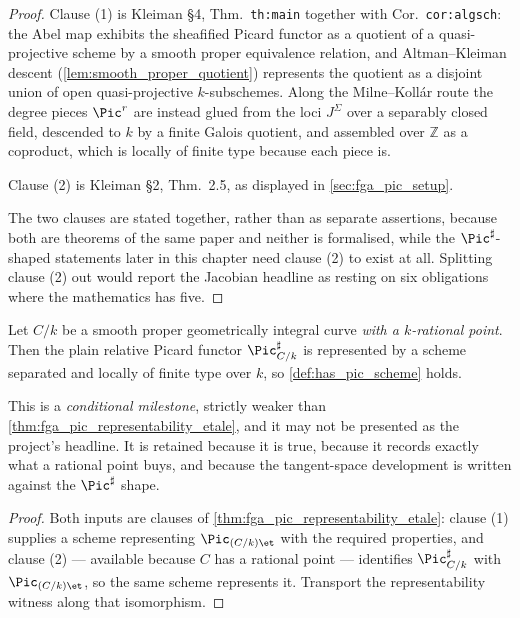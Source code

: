\begin{proof}
  Clause (1) is Kleiman \S 4, Thm.~\texttt{th:main} together with Cor.\
  \texttt{cor:algsch}: the Abel map exhibits the sheafified Picard functor as a
  quotient of a quasi-projective scheme by a smooth proper equivalence
  relation, and Altman--Kleiman descent (\cref{lem:smooth_proper_quotient})
  represents the quotient as a disjoint union of open quasi-projective
  \(k\)-subschemes. Along the Milne--Koll\'ar route the degree pieces
  \(\Pic^r\) are instead glued from the loci \(J^\Sigma\) over a separably
  closed field, descended to \(k\) by a finite Galois quotient, and assembled
  over \(\mathbb{Z}\) as a coproduct, which is locally of finite type because
  each piece is.

  Clause (2) is Kleiman \S 2, Thm.~2.5, as displayed in
  \cref{sec:fga_pic_setup}.

  The two clauses are stated together, rather than as separate assertions,
  because both are theorems of the same paper and neither is formalised, while
  the \(\Pic^\sharp\)-shaped statements later in this chapter need clause (2)
  to exist at all. Splitting clause (2) out would report the Jacobian headline
  as resting on six obligations where the mathematics has five.
\end{proof}

\begin{definition}[Picard scheme of a pointed curve]\leanok
  \label{def:inst_has_pic_scheme}
  Let \(C/k\) be a smooth proper geometrically integral curve \emph{with a
  \(k\)-rational point}. Then the plain relative Picard functor
  \(\Pic^\sharp_{C/k}\) is represented by a scheme separated and locally of
  finite type over \(k\), so \cref{def:has_pic_scheme} holds.

  This is a \emph{conditional milestone}, strictly weaker than
  \cref{thm:fga_pic_representability_etale}, and it may not be presented as the
  project's headline. It is retained because it is true, because it records
  exactly what a rational point buys, and because the tangent-space development
  is written against the \(\Pic^\sharp\) shape.
\end{definition}

\begin{proof}\leanok
  Both inputs are clauses of \cref{thm:fga_pic_representability_etale}: clause
  (1) supplies a scheme representing \(\Pic_{(C/k)\et}\) with the required
  properties, and clause (2) --- available because \(C\) has a rational point
  --- identifies \(\Pic^\sharp_{C/k}\) with \(\Pic_{(C/k)\et}\), so the same
  scheme represents it. Transport the representability witness along that
  isomorphism.
\end{proof}

